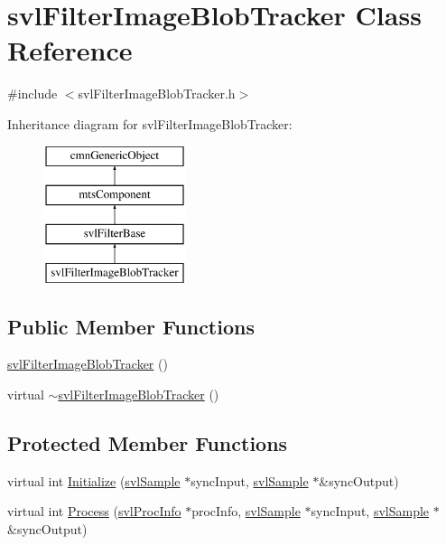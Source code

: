 \hypertarget{classsvl_filter_image_blob_tracker}{}\section{svl\+Filter\+Image\+Blob\+Tracker Class Reference}
\label{classsvl_filter_image_blob_tracker}


{\ttfamily \#include $<$svl\+Filter\+Image\+Blob\+Tracker.\+h$>$}

Inheritance diagram for svl\+Filter\+Image\+Blob\+Tracker\+:\begin{figure}[H]
\begin{center}
\leavevmode
\includegraphics[height=4.000000cm]{d0/d47/classsvl_filter_image_blob_tracker}
\end{center}
\end{figure}
\subsection*{Public Member Functions}
\begin{DoxyCompactItemize}
\item 
\hyperlink{classsvl_filter_image_blob_tracker_ae7699ad222494a4a1f4e58f10f98f404}{svl\+Filter\+Image\+Blob\+Tracker} ()
\item 
virtual \hyperlink{classsvl_filter_image_blob_tracker_a9de90b7acf4edd7422630719d40a8757}{$\sim$svl\+Filter\+Image\+Blob\+Tracker} ()
\end{DoxyCompactItemize}
\subsection*{Protected Member Functions}
\begin{DoxyCompactItemize}
\item 
virtual int \hyperlink{classsvl_filter_image_blob_tracker_ad0467f76d5d76dd9e7ba1a08d6f78e8e}{Initialize} (\hyperlink{classsvl_sample}{svl\+Sample} $\ast$sync\+Input, \hyperlink{classsvl_sample}{svl\+Sample} $\ast$\&sync\+Output)
\item 
virtual int \hyperlink{classsvl_filter_image_blob_tracker_a14adfd760107886dd8fc723933413522}{Process} (\hyperlink{structsvl_proc_info}{svl\+Proc\+Info} $\ast$proc\+Info, \hyperlink{classsvl_sample}{svl\+Sample} $\ast$sync\+Input, \hyperlink{classsvl_sample}{svl\+Sample} $\ast$\&sync\+Output)
\end{DoxyCompactItemize}
